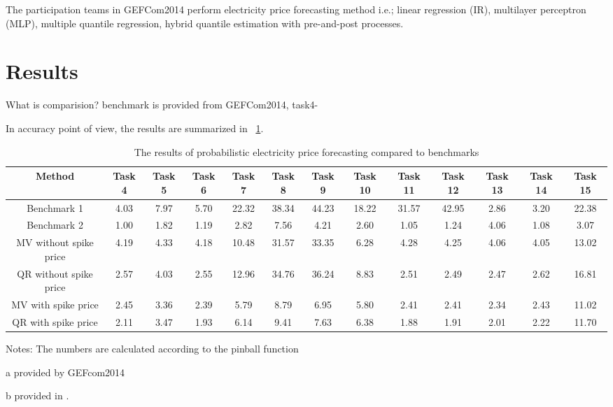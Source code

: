 \documentclass[review]{elsarticle}
\begin{document}
    The participation teams in GEFCom2014 perform electricity price forecasting method i.e.; linear regression (IR)\cite{Dudek2016}, multilayer perceptron (MLP)\cite{Dudek2016},  multiple quantile regression\cite{Juban2016}, hybrid quantile estimation with pre-and-post processes\cite{Maciejowska2016}.

\section{Results}
  What is comparision? benchmark is provided from GEFCom2014, task4-\cite{Dudek2016}


  In accuracy point of view, the results are summarized in ~\ref{table:result_pinball}.

  \begin{table}[H]
    \caption{The results of probabilistic electricity price forecasting compared to benchmarks}
    \begin{adjustbox}{width=\textwidth}
    \begin{threeparttable}
      \begin{center}
        \begin{tabular}{ccccccccccccc}
          \hline
          Method & Task 4 & Task 5& Task 6 & Task 7& Task 8 & Task 9& Task 10 & Task 11& Task 12 & Task 13 & Task 14 & Task 15\\
          \hline
          Benchmark 1 \tnote{a} & 4.03 & 7.97 & 5.70 & 22.32 & 38.34 & 44.23 & 18.22 & 31.57 & 42.95 & 2.86 & 3.20 & 22.38\\
          Benchmark 2 \tnote{b} & 1.00 & 1.82 & 1.19 & 2.82 & 7.56 & 4.21 & 2.60 & 1.05 & 1.24 & 4.06 & 1.08 & 3.07 \\
          \hline
          MV without spike price & 4.19 & 4.33 & 4.18 & 10.48 & 31.57 & 33.35 & 6.28 & 4.28 & 4.25 & 4.06 & 4.05 & 13.02\\
          QR without spike price & 2.57 & 4.03 & 2.55 & 12.96 & 34.76 & 36.24 & 8.83 & 2.51 & 2.49 & 2.47 & 2.62 & 16.81\\
          MV with spike price & 2.45 & 3.36 & 2.39 & 5.79 & 8.79 & 6.95 & 5.80 & 2.41 & 2.41 & 2.34 & 2.43 & 11.02 \\
          QR with spike price & 2.11& 3.47& 1.93 & 6.14 & 9.41 & 7.63 & 6.38 & 1.88 & 1.91 & 2.01 & 2.22 &11.70 \\
          \hline
        \end{tabular}
        \begin{tablenotes}
          Notes: The numbers are calculated according to the pinball function
          \item[a] provided by GEFcom2014
          \item[b] provided in \cite{Maciejowska2016}.
        \end{tablenotes}
        \end{center}
    \end{threeparttable}
    \end{adjustbox}
    \label{table:result_pinball}
  \end{table}
\end{document}
